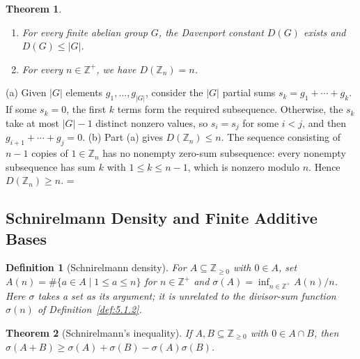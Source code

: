\documentclass[11pt]{article}
\makeatletter
\let\nt@closedisplay\]
\def\nt@guardedclose{\@ifnextchar\par{\nt@closeafterpar}{\@ifnextchar\end{\postdisplaypenalty\@M\nt@closedisplay}{\nt@closedisplay}}}
\def\nt@closeafterpar\par{\@ifnextchar\par{\nt@closeafterpar}{\@ifnextchar\end{\postdisplaypenalty\@M\nt@closedisplay\par}{\nt@closedisplay\par}}}
\renewenvironment{proof}[1][\proofname]{\par
  \pushQED{\qed}\normalfont\topsep\medskipamount\edef\nt@afterproof{\@endparpenalty=\the\@endparpenalty\relax}\@beginparpenalty\@M\@endparpenalty\@M\let\]\nt@guardedclose\trivlist\item[]\textit{#1\@addpunct{.}} \ignorespaces}{\ifvmode\addpenalty\@M\fi\popQED\nt@afterproof\endtrivlist\@endpefalse}
\theoremstyle{ntstyle}
\newtheorem{theorem}{Theorem}[subsection]
\newtheorem{definition}{Definition}[subsection]
\newcommand{\statementlist}{\mbox{}}
\makeatother
\begin{document}
\begin{theorem}\label{thm:12.3.4}\statementlist
  \begin{enumerate}[label={\alph*)}]
    \item For every finite abelian group $G$, the Davenport constant $D(G)$ exists and
          $D(G)\le|G|$.
    \item For every $n\in\mathbb{Z}^+$, we have $D(\mathbb{Z}_n)=n$.
  \end{enumerate}

\end{theorem}

\begin{proof} (a) Given $|G|$ elements $g_1, \ldots, g_{|G|}$, consider the $|G|$ partial sums $s_k = g_1 + \cdots + g_k$.
  If some $s_k = 0$, the first $k$ terms form the required subsequence.
  Otherwise, the $s_k$ take at most $|G| - 1$ distinct nonzero values,
  so $s_i = s_j$ for some $i < j$, and then $g_{i+1} + \cdots + g_j = 0$. (b) Part (a) gives
  $D(\mathbb{Z}_n)\le n$. The sequence
  consisting of $n - 1$ copies of $1\in\mathbb{Z}_n$ has no nonempty
  zero-sum subsequence: every nonempty subsequence has sum $k$ with
  $1\le k\le n - 1$, which is nonzero modulo $n$. Hence
  $D(\mathbb{Z}_n)\ge n$.
\end{proof}
\subsection{Schnirelmann Density and Finite Additive Bases}

\begin{definition}[Schnirelmann density]\label{def:12.4.1}\label{def:schnirelmann-density}
  For
  $A\subseteq\mathbb{Z}_{\ge0}$ with $0\in A$, set $A(n)=\#\{a\in A \mid 1\le a\le n\}$ for $n\in\mathbb{Z}^+$ and
  $\sigma(A)=\inf_{n\in\mathbb{Z}^+}A(n)/n$. Here $\sigma$
  takes a set as its argument; it is unrelated to the divisor-sum function
  $\sigma(n)$ of Definition~\ref{def:5.1.2}.

\end{definition}

\begin{theorem}[Schnirelmann's inequality]\label{thm:12.4.1}\label{thm:schnirelmann-inequality}
  If
  $A,B\subseteq\mathbb{Z}_{\ge0}$ with $0\in A\cap B$, then $\sigma(A+B)\ge\sigma(A)+\sigma(B)-\sigma(A)\sigma(B)$.

\end{theorem}
\end{document}
